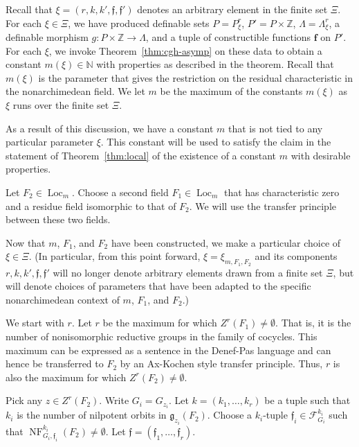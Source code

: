 \documentclass[12pt]{amsart}
\newcommand{\op}[1]{\operatorname{#1}}
\newcommand{\ring}[1]{{\mathbb #1}}
\def\NF{\op{NF}}
\def\s{{\mathfrak{f}}}
\def\bf{\mathbf f}
\newcommand{\cF}{\mathcal{F}}
\newcommand{\fg}{\mathfrak{g}}
\theoremstyle{plain}
\theoremstyle{definition}
\begin{document}
Recall that $\xi=(r,k,k',\s,\s')$ denotes an arbitrary element in the
finite set $\Xi$.  For each $\xi\in\Xi$, we have produced definable
sets $P=P^r_\xi$, $P'=P\times\ring{Z}$, $\Lambda=\Lambda^r_\xi$, a
definable morphism $g:P\times\ring{Z}\to \Lambda$, and a tuple of
constructible functions $\bf$ on $P'$.  For each $\xi$, we invoke
Theorem~\ref{thm:cgh-asymp} on these data to obtain a constant
$m(\xi)\in\ring{N}$ with properties as described in the theorem.
Recall that $m(\xi)$ is the parameter that gives the restriction on
the residual characteristic in the nonarchimedean field.  We let $m$
be the maximum of the constants $m(\xi)$ as $\xi$ runs over the finite
set $\Xi$.

As a result of this discussion, we have a constant $m$ that is not
tied to any particular parameter $\xi$.  This constant will be used to
satisfy the claim in the statement of Theorem~\ref{thm:local} of the
existence of a constant $m$ with desirable properties.

Let $F_2\in\op{Loc}_m$.  Choose a second field $F_1\in \op{Loc}_m$
that has characteristic zero and a residue field isomorphic to that of
$F_2$.  We will use the transfer principle between these two fields.

Now that $m$, $F_1$, and $F_2$ have been constructed, we make a
particular choice of $\xi\in\Xi$.  (In particular, from this point
forward, $\xi=\xi_{m,F_1,F_2}$ and its components $r,k,k',\s,\s'$ will no longer
denote arbitrary elements drawn from a finite set $\Xi$, but will
denote choices of parameters that have been adapted to the specific
nonarchimedean context of $m$, $F_1$, and $F_2$.)


We start with $r$.  Let $r$ be the
maximum for which $Z^r(F_1)\ne\emptyset$.  That is, it is the number
of nonisomorphic reductive groups in the family of cocycles.  This
maximum can be expressed as a sentence in the Denef-Pas language and
can hence be transferred to $F_2$ by an Ax-Kochen style transfer
principle.  Thus, $r$ is also the maximum for which
$Z^r(F_2)\ne\emptyset$.


Pick any $z\in Z^r(F_2)$.  Write $G_i=G_{z_i}$.  Let
$k=(k_1,\ldots,k_r)$ be a tuple such that $k_i$ is the number of
nilpotent orbits in $\fg_{z_i}(F_2)$.  Choose a $k_i$-tuple $\s_i\in
\cF_{G_i}^{k_i}$ such that $\NF^{k_i}_{G_i,\s_i}(F_2)\ne \emptyset$.
Let $\s = (\s_1,\ldots,\s_r)$.
\end{document}
